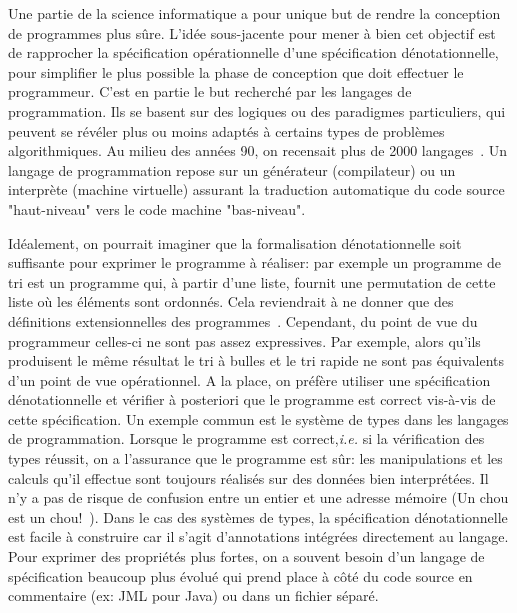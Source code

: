 Une partie de la science informatique a pour unique but de rendre la conception de programmes
plus sûre. L'idée sous-jacente pour mener à bien cet objectif est de rapprocher 
la spécification opérationnelle d'une spécification dénotationnelle,
pour simplifier le plus possible la phase de conception que doit effectuer le programmeur.
C'est en partie le but recherché par les langages de programmation.
Ils se basent sur des logiques ou des paradigmes particuliers, qui peuvent se révéler plus ou moins
adaptés à certains types de problèmes algorithmiques. Au milieu des années 90, on recensait plus 
de 2000 langages~\cite{DOWEK-LANG}. Un langage de programmation repose 
sur un générateur (compilateur) ou un interprète (machine virtuelle) assurant la traduction automatique
du code source "haut-niveau" vers le code machine "bas-niveau".

Idéalement, on pourrait imaginer que la formalisation dénotationnelle soit suffisante
pour exprimer le programme à réaliser: par exemple un programme de tri est un programme
qui, à partir d'une liste, fournit une permutation de cette liste où les éléments sont
ordonnés. Cela reviendrait à ne donner que des définitions extensionnelles des programmes~\cite{DOWEK-LANG}.
Cependant, du point de vue du programmeur celles-ci ne sont pas assez expressives. 
Par exemple, alors qu'ils produisent le même résultat le tri à bulles et le tri rapide ne sont pas équivalents
d'un point de vue opérationnel.
A la place, on préfère utiliser une spécification dénotationnelle et vérifier à posteriori
que le programme est correct vis-à-vis de cette spécification. 
Un exemple commun est le système de types dans les langages de programmation. 
Lorsque le programme est correct,\textit{i.e.} si la vérification des types réussit,
on a l'assurance que le programme est sûr: 
les manipulations et les calculs qu'il effectue sont toujours réalisés sur des données
bien interprétées. Il n'y a pas de risque de confusion entre un entier et une adresse mémoire
(Un chou est un chou!~\cite{ASTERIX}).
Dans le cas des systèmes de types, la spécification dénotationnelle est facile à construire
car il s'agit d'annotations intégrées directement au langage. Pour exprimer
des propriétés plus fortes, on a souvent besoin d'un langage de spécification beaucoup
plus évolué qui prend place à côté du code source en commentaire (ex: JML pour Java) ou 
dans un fichier séparé.

